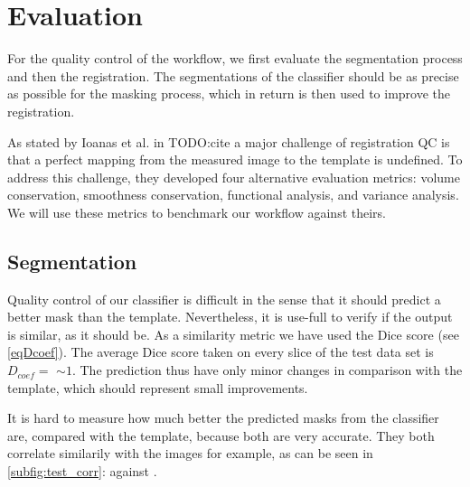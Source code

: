 \section{Evaluation}
For the quality control of the workflow, we first evaluate the segmentation process and then the registration.
The segmentations of the classifier should be as precise as possible for the masking process, which in return is then used to improve the registration.

As stated by Ioanas et al. in TODO:cite a major challenge of registration QC is that a perfect mapping from the measured image to the template is undefined.
To address this challenge, they developed four alternative evaluation metrics: volume conservation, smoothness conservation, functional analysis, and variance analysis.
We will use these metrics to benchmark our workflow against theirs.

\subsection{Segmentation}
Quality control of our classifier is difficult in the sense that it should predict a better mask than the template.
Nevertheless, it is use-full to verify if the output is similar, as it should be.
As a similarity metric we have used the Dice score (see \cref{eqDcoef}).
The average Dice score taken on every slice of the test data set is $D_{coef}= $  $\sim 1$.
The prediction thus have only minor changes in comparison with the template, which should represent small improvements.


\begin{sansmath}
\end{sansmath}


\iffalse
It is hard to measure how much better the predicted masks from the classifier are, compared with the template, because both are very accurate.
They both correlate similarily with the images for example, as can be seen in \cref{subfig:test_corr}:
 against .

